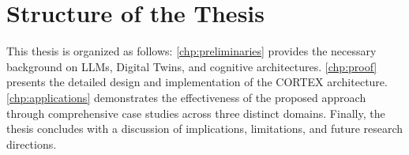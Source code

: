 \section{Structure of the Thesis}

This thesis is organized as follows: \autoref{chp:preliminaries} provides the necessary background on LLMs, Digital Twins, and cognitive architectures. \autoref{chp:proof} presents the detailed design and implementation of the CORTEX architecture. \autoref{chp:applications} demonstrates the effectiveness of the proposed approach through comprehensive case studies across three distinct domains. Finally, the thesis concludes with a discussion of implications, limitations, and future research directions.